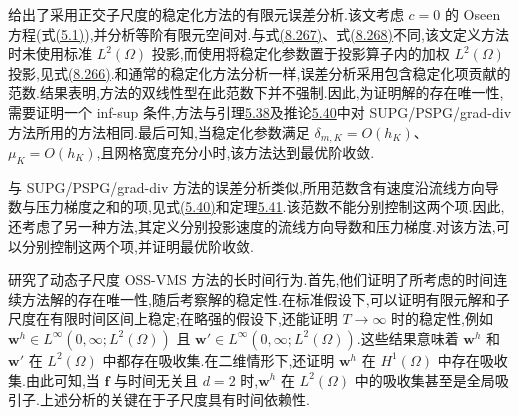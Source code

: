 \begin{note}[有限元误差分析]
\label{note:vms-oss-error-analysis}
\textcite{Codina2008}给出了采用正交子尺度的稳定化方法的有限元误差分析.该文考虑 $c=0$ 的 Oseen 方程(式\hyperref[eq:oseen-strong]{(5.1)}),并分析等阶有限元空间对.与式\hyperref[eq:vms-oss-resolved-scale-method]{(8.267)}、式\hyperref[eq:vms-oss-subscale-update]{(8.268)}不同,该文定义方法时未使用标准 $L^2(\Omega)$ 投影,而使用将稳定化参数置于投影算子内的加权 $L^2(\Omega)$ 投影,见式\hyperref[eq:vms-oss-projected-subscale-model]{(8.266)}.和通常的稳定化方法分析一样,误差分析采用包含稳定化项贡献的范数.结果表明,方法的双线性型在此范数下并不强制.因此,为证明解的存在唯一性,需要证明一个 inf-sup 条件,方法与引理\hyperref[lem:oseen-spg-discrete-infsup]{5.38}及推论\hyperref[cor:oseen-spg-existence-uniqueness]{5.40}中对 SUPG/PSPG/grad-div 方法所用的方法相同.最后可知,当稳定化参数满足 $\delta_{m,K}=O(h_K)$、$\mu_K=O(h_K)$,且网格宽度充分小时,该方法达到最优阶收敛.

与 SUPG/PSPG/grad-div 方法的误差分析类似,所用范数含有速度沿流线方向导数与压力梯度之和的项,见式\hyperref[eq:oseen-spg-norm]{(5.40)}和定理\hyperref[thm:oseen-spg-error-estimate]{5.41}.该范数不能分别控制这两个项.因此,\textcite{Codina2008}还考虑了另一种方法,其定义分别投影速度的流线方向导数和压力梯度.对该方法,可以分别控制这两个项,并证明最优阶收敛.

\textcite{BadiaCodinaGutierrezSantacreu2010}研究了动态子尺度 OSS-VMS 方法的长时间行为.首先,他们证明了所考虑的时间连续方法解的存在唯一性,随后考察解的稳定性.在标准假设下,可以证明有限元解和子尺度在有限时间区间上稳定;在略强的假设下,还能证明 $T\to\infty$ 时的稳定性,例如 $\bm w^h\in L^\infty(0,\infty;L^2(\Omega))$ 且 $\bm w'\in L^\infty(0,\infty;L^2(\Omega))$.这些结果意味着 $\bm w^h$ 和 $\bm w'$ 在 $L^2(\Omega)$ 中都存在吸收集.在二维情形下,\textcite{BadiaCodinaGutierrezSantacreu2010}还证明 $\bm w^h$ 在 $H^1(\Omega)$ 中存在吸收集.由此可知,当 $\bm f$ 与时间无关且 $d=2$ 时,$\bm w^h$ 在 $L^2(\Omega)$ 中的吸收集甚至是全局吸引子.上述分析的关键在于子尺度具有时间依赖性.
\end{note}


